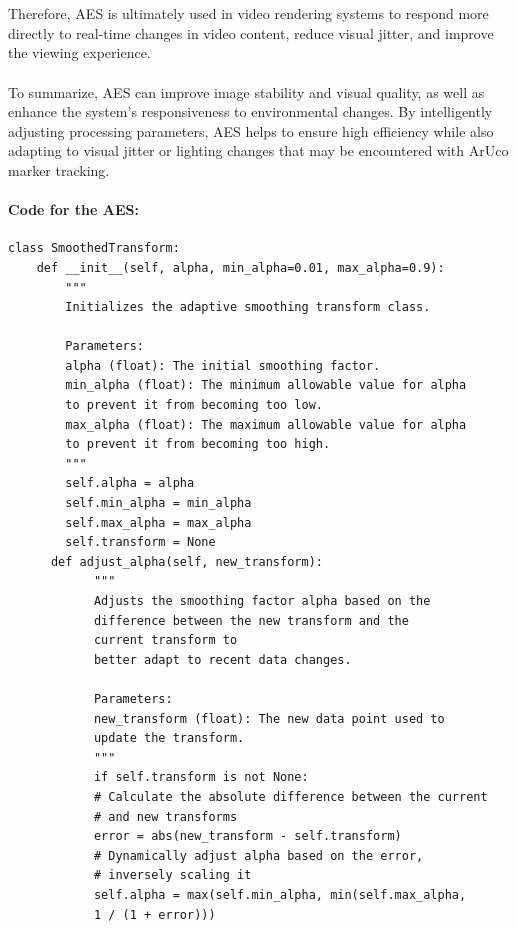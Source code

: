 \documentclass[12pt]{article}
\begin{document}
\begin{enumerate}
\begin{enumerate}
                        \\\\
                        Therefore, AES is ultimately used in video rendering systems to respond more directly to real-time changes in video content, reduce visual jitter, and improve the viewing experience.
                        \\\\
                        To summarize, AES can improve image stability and visual quality, as well as enhance the system's responsiveness to environmental changes. By intelligently adjusting processing parameters, AES helps to ensure high efficiency while also adapting to visual jitter or lighting changes that may be encountered with ArUco marker tracking.
                        \paragraph{Code for the AES:}
                        \begin{verbatim}
class SmoothedTransform:
    def __init__(self, alpha, min_alpha=0.01, max_alpha=0.9):
        """
        Initializes the adaptive smoothing transform class.
        
        Parameters:
        alpha (float): The initial smoothing factor.
        min_alpha (float): The minimum allowable value for alpha 
        to prevent it from becoming too low.
        max_alpha (float): The maximum allowable value for alpha 
        to prevent it from becoming too high.
        """
        self.alpha = alpha
        self.min_alpha = min_alpha
        self.max_alpha = max_alpha
        self.transform = None
      def adjust_alpha(self, new_transform):
            """
            Adjusts the smoothing factor alpha based on the 
            difference between the new transform and the 
            current transform to 
            better adapt to recent data changes.
                                          
            Parameters:
            new_transform (float): The new data point used to 
            update the transform.
            """
            if self.transform is not None:
            # Calculate the absolute difference between the current 
            # and new transforms
            error = abs(new_transform - self.transform)
            # Dynamically adjust alpha based on the error, 
            # inversely scaling it
            self.alpha = max(self.min_alpha, min(self.max_alpha, 
            1 / (1 + error)))
                              

\end{verbatim}
\end{enumerate}
\end{enumerate}
\end{document}

